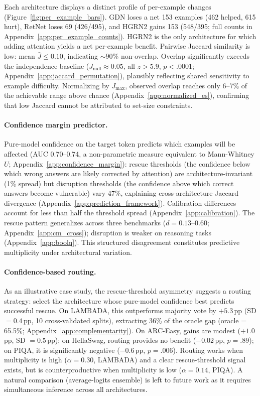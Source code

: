 Each architecture displays a distinct profile of per-example changes (Figure~\ref{fig:per_example_bars}). GDN loses a net 153 examples (462 helped, 615 hurt), RetNet loses 69 (426/495), and HGRN2 gains 153 (548/395; full counts in Appendix~\ref{app:per_example_counts}). HGRN2 is the only architecture for which adding attention yields a net per-example benefit. Pairwise Jaccard similarity is low: mean $\bar{J} \leq 0.10$, indicating ${\sim}90$\% non-overlap. Overlap significantly exceeds the independence baseline ($J_{\text{null}} \approx 0.05$, all $z > 5.9$, $p < .0001$; Appendix~\ref{app:jaccard_permutation}), plausibly reflecting shared sensitivity to example difficulty. Normalizing by $J_{\max}$, observed overlap reaches only 6--7\% of the achievable range above chance (Appendix~\ref{app:normalized_es}), confirming that low Jaccard cannot be attributed to set-size constraints.


\paragraph{Confidence margin predictor.} Pure-model confidence on the target token predicts which examples will be affected (AUC 0.70--0.74, a non-parametric measure equivalent to Mann-Whitney $U$; Appendix~\ref{app:confidence_margin}): rescue thresholds (the confidence below which wrong answers are likely corrected by attention) are architecture-invariant (1\% spread) but disruption thresholds (the confidence above which correct answers become vulnerable) vary 47\%, explaining cross-architecture Jaccard divergence (Appendix~\ref{app:prediction_framework}). Calibration differences account for less than half the threshold spread (Appendix~\ref{app:calibration}). The rescue pattern generalizes across three benchmarks ($d = 0.13$--$0.60$; Appendix~\ref{app:cm_cross}); disruption is weaker on reasoning tasks (Appendix~\ref{app:boolq}). This structured disagreement constitutes predictive multiplicity \citep{marx2020predictive} under architectural variation.

\paragraph{Confidence-based routing.} As an illustrative case study, the rescue-threshold asymmetry suggests a routing strategy: select the architecture whose pure-model confidence best predicts successful rescue. On LAMBADA, this outperforms majority vote by $+5.3$\,pp (SD $= 0.4$\,pp, 10 cross-validated splits), extracting 36\% of the oracle gap (oracle = 65.5\%; Appendix~\ref{app:complementarity}). On ARC-Easy, gains are modest ($+1.0$\,pp, SD $= 0.5$\,pp); on HellaSwag, routing provides no benefit ($-0.02$\,pp, $p = .89$); on PIQA, it is significantly negative ($-0.6$\,pp, $p = .006$). Routing works when multiplicity is high ($\alpha = 0.30$, LAMBADA) and a clear rescue-threshold signal exists, but is counterproductive when multiplicity is low ($\alpha = 0.14$, PIQA). A natural comparison (average-logits ensemble) is left to future work as it requires simultaneous inference across all architectures.

